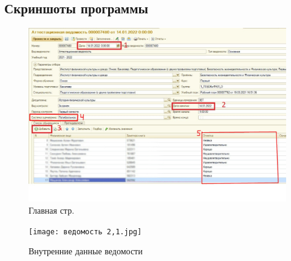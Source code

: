 \documentclass[12pt,a4paper]{scrartcl}
\begin{document}
\subsection {Скриншоты программы}
\begin{figure}[h]
	\centering
	\includegraphics[width=1 \textwidth]{Vedom 2}
	\caption{Главная стр.}\label{fig:par}
\end{figure}
\begin{figure}[h]
	\centering
	\texttt{[image: ведомость 2,1.jpg]}
	\caption{Внутренние данные ведомости}\label{fig:par}
\end{figure}
\end{document}
